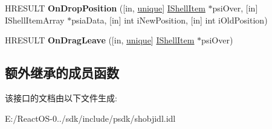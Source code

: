\begin{DoxyCompactItemize}
\item 
\mbox{\label{interface_i_name_space_tree_control_drop_handler_a7cf27183851d20d3e5df714ea827dae2}} 
H\+R\+E\+S\+U\+LT {\bfseries On\+Drop\+Position} (\mbox{[}in, \hyperlink{interfaceunique}{unique}\mbox{]} \hyperlink{interface_i_shell_item}{I\+Shell\+Item} $\ast$psi\+Over, \mbox{[}in\mbox{]} I\+Shell\+Item\+Array $\ast$psia\+Data, \mbox{[}in\mbox{]} int i\+New\+Position, \mbox{[}in\mbox{]} int i\+Old\+Position)
\item 
\mbox{\label{interface_i_name_space_tree_control_drop_handler_ac9b1d64fe7020e06950bad2b9dd214e0}} 
H\+R\+E\+S\+U\+LT {\bfseries On\+Drag\+Leave} (\mbox{[}in, \hyperlink{interfaceunique}{unique}\mbox{]} \hyperlink{interface_i_shell_item}{I\+Shell\+Item} $\ast$psi\+Over)
\end{DoxyCompactItemize}
\subsection*{额外继承的成员函数}


该接口的文档由以下文件生成\+:\begin{DoxyCompactItemize}
\item 
E\+:/\+React\+O\+S-\/0../sdk/include/psdk/shobjidl.\+idl\end{DoxyCompactItemize}
